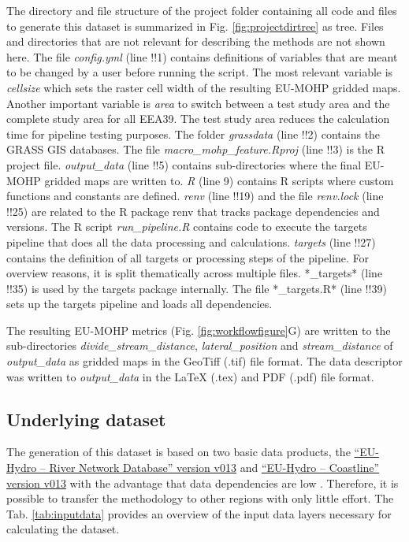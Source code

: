 \documentclass[fleqn,10pt]{wlscirep}
\begin{document}
The directory and file structure of the project folder containing all code and files to generate this dataset is summarized in Fig. \ref{fig:projectdirtree} as tree. Files and directories that are not relevant for describing the methods are not shown here. The file \emph{config.yml} (line !!1) contains definitions of variables that are meant to be changed by a user before running the script. The most relevant variable is \emph{cellsize} which sets the raster cell width of the resulting EU-MOHP gridded maps. Another important variable is \emph{area} to switch between a test study area and the complete study area for all EEA39. The test study area reduces the calculation time for pipeline testing purposes. The folder \emph{grassdata} (line !!2) contains the GRASS GIS databases. The file \emph{macro\_mohp\_feature.Rproj} (line !!3) is the R project file. \emph{output\_data} (line !!5) contains sub-directories where the final EU-MOHP gridded maps are written to. \emph{R} (line 9) contains R scripts where custom functions and constants are defined. \emph{renv} (line !!19) and the file \emph{renv.lock} (line !!25) are related to the R package renv that tracks package dependencies and versions. The R script \emph{run\_pipeline.R} contains code to execute the targets pipeline that does all the data processing and calculations. \emph{targets} (line !!27) contains the definition of all targets or processing steps of the pipeline. For overview reasons, it is split thematically across multiple files. *\_targets* (line !!35) is used by the targets package internally. The file *\_targets.R* (line !!39) sets up the targets pipeline and loads all dependencies.

The resulting EU-MOHP metrics (Fig. \ref{fig:workflowfigure}G) are written to the sub-directories \emph{divide\_stream\_distance}, \emph{lateral\_position} and \emph{stream\_distance} of \emph{output\_data} as gridded maps in the GeoTiff (.tif) file format. The data descriptor was written to \emph{output\_data} in the LaTeX (.tex) and PDF (.pdf) file format.

\hypertarget{underlying-dataset}{%
\subsection*{Underlying dataset}\label{underlying-dataset}}

The generation of this dataset is based on two basic data products, the \href{https://land.copernicus.eu/imagery-in-situ/eu-hydro/eu-hydro-river-network-database?tab=download}{``EU-Hydro -- River Network Database'' version v013} and \href{https://land.copernicus.eu/imagery-in-situ/eu-hydro/eu-hydro-coastline?tab=download}{``EU-Hydro -- Coastline'' version v013} with the advantage that data dependencies are low \cite{noauthor_eu-hydro_2021, noauthor_eu-hydro_2021-1}. Therefore, it is possible to transfer the methodology to other regions with only little effort. The Tab. \ref{tab:inputdata} provides an overview of the input data layers necessary for calculating the dataset.
\end{document}
